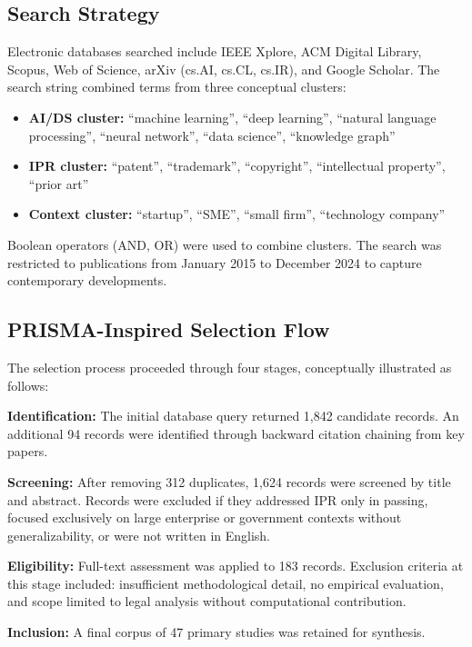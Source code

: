 \documentclass[conference]{IEEEtran}
\begin{document}
\subsection{Search Strategy}

Electronic databases searched include IEEE Xplore, ACM Digital Library, Scopus, Web of Science, arXiv (cs.AI, cs.CL, cs.IR), and Google Scholar. The search string combined terms from three conceptual clusters:

\begin{itemize}
    \item \textbf{AI/DS cluster:} ``machine learning'', ``deep learning'', ``natural language processing'', ``neural network'', ``data science'', ``knowledge graph''
    \item \textbf{IPR cluster:} ``patent'', ``trademark'', ``copyright'', ``intellectual property'', ``prior art''
    \item \textbf{Context cluster:} ``startup'', ``SME'', ``small firm'', ``technology company''
\end{itemize}

Boolean operators (AND, OR) were used to combine clusters. The search was restricted to publications from January 2015 to December 2024 to capture contemporary developments.

\subsection{PRISMA-Inspired Selection Flow}

The selection process proceeded through four stages, conceptually illustrated as follows:

\textbf{Identification:} The initial database query returned 1,842 candidate records. An additional 94 records were identified through backward citation chaining from key papers.

\textbf{Screening:} After removing 312 duplicates, 1,624 records were screened by title and abstract. Records were excluded if they addressed IPR only in passing, focused exclusively on large enterprise or government contexts without generalizability, or were not written in English.

\textbf{Eligibility:} Full-text assessment was applied to 183 records. Exclusion criteria at this stage included: insufficient methodological detail, no empirical evaluation, and scope limited to legal analysis without computational contribution.

\textbf{Inclusion:} A final corpus of 47 primary studies was retained for synthesis.
\end{document}
